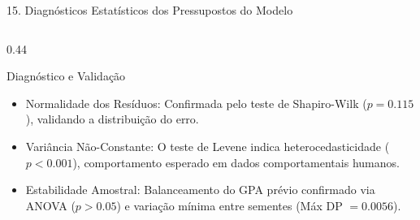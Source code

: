 \documentclass[aspectratio=169, 10pt]{beamer}
\begin{document}
\begin{frame}{15. Diagnósticos Estatísticos dos Pressupostos do Modelo}
\begin{columns}[T]
        \begin{column}{0.44\textwidth}
            \begin{exampleblock}{Diagnóstico e Validação}
                \begin{itemize}\small
                    \item Normalidade dos Resíduos: Confirmada pelo teste de Shapiro-Wilk ($p = 0.115$), validando a distribuição do erro. 
                    \item Variância Não-Constante: O teste de Levene indica heterocedasticidade ($p < 0.001$), comportamento esperado em dados comportamentais humanos. 
                    \item Estabilidade Amostral: Balanceamento do GPA prévio confirmado via ANOVA ($p > 0.05$) e variação mínima entre sementes (Máx DP $= 0.0056$).
                \end{itemize}
            \end{exampleblock}
        \end{column}
    \end{columns}
\end{frame}
\end{document}

